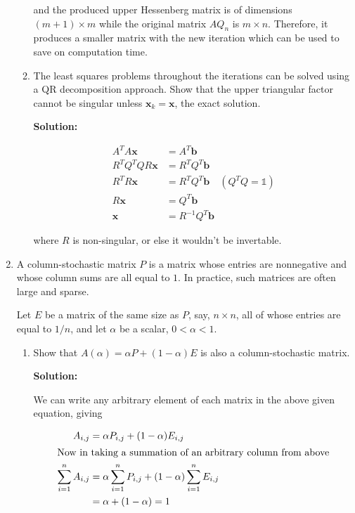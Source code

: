 \documentclass[12pt]{article}
\newcommand{\vect}{\mathbf}
\newcommand{\Id}{\mathbb{1}}
\newcommand{\inv}[1]{ #1^{-1}}
\renewcommand{\P}[1]{\left( #1 \right)}
\begin{document}
\begin{enumerate}
\begin{enumerate}
and the produced upper Hessenberg matrix is of dimensions $(m + 1) \times m$ while
the original matrix $AQ_{n}$ is $m \times n$. Therefore, it produces a smaller matrix
with the new iteration which can be used to save on computation time.

\item The least squares problems throughout the iterations can be solved using a
QR decomposition approach. Show that the upper triangular factor cannot be singular
unless $\mathbf{x}_{k} = \mathbf{x}$, the exact solution.

{\bf Solution: }

\begin{align*}
  A^{T}A\vect{x} &= A^{T}\vect{b}\\
  R^{T}Q^{T}QR\vect{x} &= R^{T}Q^{T}\vect{b}\\
  R^{T}R\vect{x} &= R^{T}Q^{T}\vect{b}\quad \P{Q^{T}Q = \Id}\\
  R\vect{x} &= Q^{T}\vect{b}\\
  \vect{x} &= \inv{R} Q^{T} \vect{b}
\end{align*}

where $R$ is non-singular, or else it wouldn't be invertable.


\end{enumerate}

\item A column-stochastic matrix $P$ is a matrix whose entries are nonnegative
and whose column sums are all equal to $1$. In practice, such matrices are often
large and sparse.

Let $E$ be a matrix of the same size as $P$, say, $n\times n$, all of whose entries
are equal to $1/n$, and let $\alpha$ be a scalar, $0 < \alpha < 1$.

\begin{enumerate}
  \item Show that $A(\alpha) = \alpha P + (1-\alpha )E$ is also a column-stochastic matrix.

  {\bf Solution:}

  We can write any arbitrary element of each matrix in the above given equation, giving

  \begin{align*}
    A_{i,j} &= \alpha P_{i,j} + (1 - \alpha) E_{i,j}\\
    \intertext{Now in taking a summation of an arbitrary column from above}
    \sum_{i=1}^{n}A_{i,j} &= \alpha \sum_{i=1}^{n}P_{i,j} + (1-\alpha)\sum_{i=1}^{n}E_{i,j}\\
    &= \alpha + (1 - \alpha) = 1
  \end{align*}


\end{enumerate}
\end{enumerate}
\end{document}
